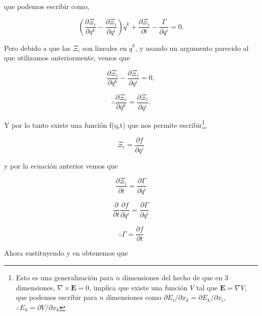 \documentclass[a4paper,10pt]{article}
\numberwithin{equation}{section}
\begin{document}
que podemos escribir como,

\begin{equation}
 \left( \frac{\partial \Xi_i}{\partial q^k} - \frac{\partial \Xi_i}{\partial q^i}\right) \dot{q}^k
 + \frac{\partial \Xi_i}{\partial t} - \frac{\Gamma}{\partial q^i} = 0.
\end{equation}

Pero debido a que las $\Xi_i$ son lineales en $\dot{q}^k$, y usando un argumento 
parecido al que utilizamos anteriormente, vemos que 

\begin{equation}
 \frac{\partial \Xi_i}{\partial q^k} - \frac{\partial \Xi_i}{\partial q^i} = 0,
\end{equation}

\begin{equation}
 \therefore \frac{\partial \Xi_i}{\partial q^k} = \frac{\partial \Xi_i}{\partial q^i}.
\end{equation}

Y por lo tanto existe una función f(q,t) que nos permite escribir\footnote{Esto es una 
generalización para $n$ dimensiones del hecho de que en 3 dimensiones, $\nabla \times \mathbf{E} = 0$,
implica que existe una función $V$ tal que $\mathbf{E} = \nabla V$, que podemos escribir para 
$n$ dimensiones como $\partial E_i / \partial x_k = \partial E_k / \partial x_i$, 
$\therefore E_k = \partial V / \partial x_k$},

\begin{equation}
 \Xi_i = \frac{\partial f}{\partial q^i}
 \label{eq:4xi2}
\end{equation}

y por la ecuación anterior vemos que 

\begin{equation}
 \frac{\partial \Xi_i}{\partial t} = \frac{\partial \Gamma}{\partial q^i}
\end{equation}

\begin{equation}
 \frac{\partial}{\partial t}\frac{\partial f}{\partial q^i} = \frac{\partial \Gamma}{\partial q^i}
\end{equation}

\begin{equation}
 \therefore \Gamma = \frac{\partial f}{\partial t}
 \label{eq:4gamma}
\end{equation}

Ahora sustituyendo  y  en  obtenemos que 
\end{document}
